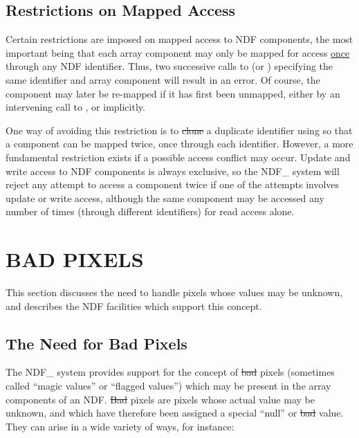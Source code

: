 \subsection{\label{ss:restrictionsonmapping}Restrictions on Mapped Access}

Certain restrictions are imposed on mapped access to NDF components, the
most important being that each array component may only be mapped for access
\underline{once} through any NDF identifier. 
Thus, two successive calls to  (or ) specifying the same
identifier and array component will result in an error. 
Of course, the component may later be re-mapped if it has first been
unmapped, either by an intervening call to , or implicitly.

One way of avoiding this restriction is to \st{clone\/} a duplicate identifier
using  so that a component can be mapped twice, once through each
identifier. 
However, a more fundamental restriction exists if a possible access conflict may
occur.
Update and write access to NDF components is always exclusive, so the NDF\_
system will reject any attempt to access a component twice if one of the
attempts involves update or write access, although the same component may be
accessed any number of times (through different identifiers) for read access
alone.


\section{\label{ss:badpixels}BAD PIXELS}

This section discusses the need to handle pixels whose values may be
unknown, and describes the NDF facilities which support this concept. 

\subsection{The Need for Bad Pixels}

The NDF\_ system provides support for the concept of \st{bad\/} pixels
(sometimes called ``magic values'' or ``flagged values'') which may be present
in the array components of an NDF. 
\st{Bad\/} pixels are pixels whose actual value may be unknown, and which
have therefore been assigned a special ``null'' or \st{bad\/} value. 
They can arise in a wide variety of ways, for instance:

